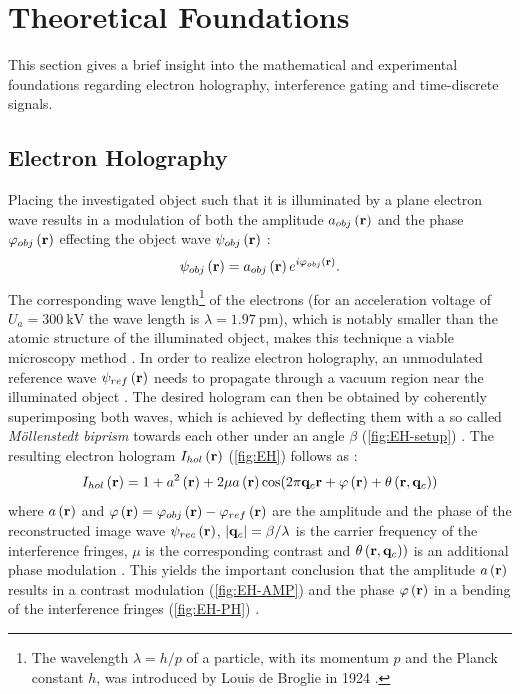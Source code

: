 \section{Theoretical Foundations} \label{sec:theoretical-foundations}
This section gives a brief insight into the mathematical and experimental foundations regarding electron holography, interference gating and time-discrete signals.
\subsection{Electron Holography} \label{ssec:electron-holography}
Placing the investigated object such that it is illuminated by a plane electron wave results in a modulation of both the amplitude $a_{obj}\left(\vb{r}\right)$ and the phase ${\varphi}_{obj}\left(\vb{r}\right)$ effecting the object wave ${\psi}_{obj}\left(\vb{r}\right)$ \cite{Lehmann2002,Lichte2007}:
\begin{equation}
	{\psi}_{obj}\left(\vb{r}\right) = a_{obj}\left(\vb{r}\right) e^{i{\varphi}_{obj}\left(\vb{r}\right)}.
\end{equation}
The corresponding wave length\footnote{The wavelength $\lambda = h/p$ of a particle, with its momentum $p$ and the Planck constant $h$, was introduced by Louis de Broglie in 1924 \cite{BrogliePhD1924}.} of the electrons (for an acceleration voltage of $U_a = \SI{300}{\kilo\volt}$ the wave length is $\lambda = \SI{1.97}{\pico\metre}$), which is notably smaller than the atomic structure of the illuminated object, makes this technique a viable microscopy method \cite{Lichte2007,Gabor1948}. In order to realize electron holography, an unmodulated reference wave ${\psi}_{ref}\left(\vb{r}\right)$ needs to propagate through a vacuum region near the illuminated object \cite{Lehmann2002,Lichte2007}. The desired hologram can then be obtained by coherently superimposing both waves, which is achieved by deflecting them with a so called \emph{Möllenstedt biprism} towards each other under an angle $\beta$ (\cref{fig:EH-setup}) \cite{Moellenstedt1956}. The resulting electron hologram $I_{hol}\left(\vb{r}\right)$ (\cref{fig:EH}) follows as \cite{Lehmann2002,Lichte2007}:
\begin{equation}
	I_{hol}\left(\vb{r}\right) = 1 + a^2\left(\vb{r}\right) + 2\mu a\left(\vb{r}\right)\cos(2\pi \vb{q}_c\vb{r} + \varphi\left(\vb{r}\right) + \theta\left(\vb{r},\vb{q}_c\right))
\end{equation}
where $a\left(\vb{r}\right)$ and $\varphi\left(\vb{r}\right) = {\varphi}_{obj}\left(\vb{r}\right) - {\varphi}_{ref}\left(\vb{r}\right)$ are the amplitude and the phase of the reconstructed image wave ${\psi}_{rec}\left(\vb{r}\right)$, $\abs{\vb{q}_c} = {\beta}/{\lambda}$ is the carrier frequency of the interference fringes, $\mu$ is the corresponding contrast \cite{Lehmann2002,Lichte2007} and $\theta\left(\vb{r}, \vb{q}_c\right))$ is an additional phase modulation \cite{LehmannPhD1997}. This yields the important conclusion that the amplitude $a\left(\vb{r}\right)$ results in a contrast modulation (\cref{fig:EH-AMP}) and the phase $\varphi\left(\vb{r}\right)$ in a bending of the interference fringes (\cref{fig:EH-PH}) \cite{Lehmann2002,Lichte2007}.
